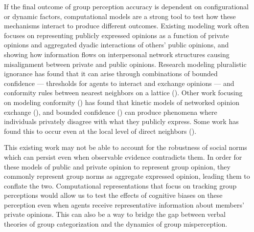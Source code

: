 If the final outcome of group perception accuracy is dependent on configurational or dynamic factors, computational models are a strong tool to test how these mechanisms interact to produce different outcomes. 
Existing modeling work often focuses on representing publicly expressed opinions as a function of private opinions and aggregated dyadic interactions of others' public opinions, and showing how information flows on interpersonal network structures causing misalignment between private and public opinions. 
Research modeling pluralistic ignorance has found that it can arise through combinations of bounded confidence --- thresholds for agents to interact and exchange opinions --- and conformity rules between nearest neighbors on a lattice 
(\cite{huang_novel_2014}). 
Other work focusing on modeling conformity (\cite{ye_influence_2019})
has found that kinetic models of networked opinion exchange (\cite{roy_opinion_2022}), 
and bounded confidence (\cite{hou_opinion_2021})
can produce phenomena where individuals privately disagree with what they publicly express.
Some work has found this to occur even at the local level of direct neighbors (\cite{manfredi_private-public_2020}). 

This existing work may not be able to account for the robustness of social norms which can persist even when observable evidence contradicts them. 
In order for these models of public and private opinion to represent group opinion, they commonly represent group norms as aggregate expressed opinion, leading them to conflate the two. 
Computational representations that focus on tracking group perceptions would allow us to test the effects of cognitive biases on these perception even when agents receive representative information about members' private opinions. 
This can also be a way to bridge the gap between verbal theories of group categorization and the dynamics of group misperception.

